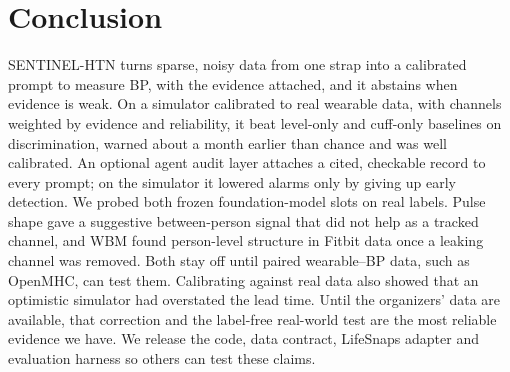 \documentclass[conference]{IEEEtran}
\begin{document}
\section{Conclusion}
SENTINEL-HTN turns sparse, noisy data from one strap into a calibrated prompt to measure BP, with the evidence attached, and it abstains when evidence is weak. On a simulator calibrated to real wearable data, with channels weighted by evidence and reliability, it beat level-only and cuff-only baselines on discrimination, warned about a month earlier than chance and was well calibrated. An optional agent audit layer attaches a cited, checkable record to every prompt; on the simulator it lowered alarms only by giving up early detection. We probed both frozen foundation-model slots on real labels. Pulse shape gave a suggestive between-person signal that did not help as a tracked channel, and WBM found person-level structure in Fitbit data once a leaking channel was removed. Both stay off until paired wearable--BP data, such as OpenMHC, can test them. Calibrating against real data also showed that an optimistic simulator had overstated the lead time. Until the organizers' data are available, that correction and the label-free real-world test are the most reliable evidence we have. We release the code, data contract, LifeSnaps adapter and evaluation harness so others can test these claims.
\end{document}
